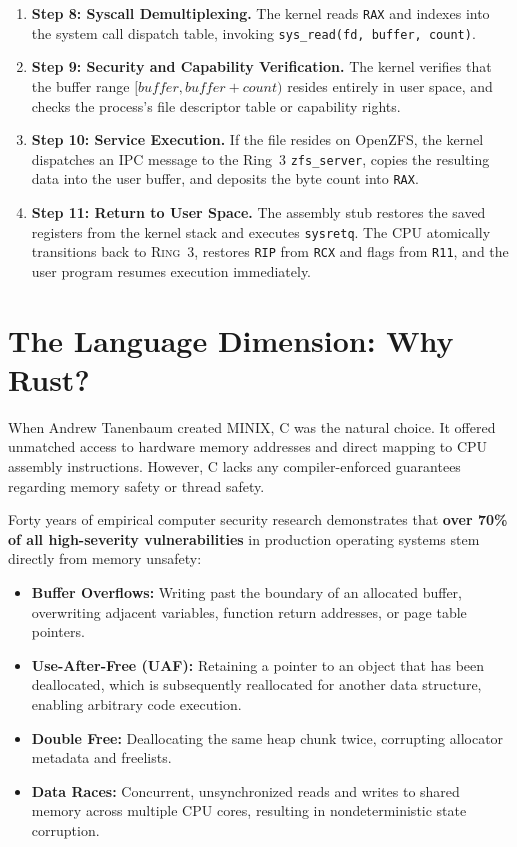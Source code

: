 \begin{enumerate}
    \item \textbf{Step 8: Syscall Demultiplexing.} The kernel reads \texttt{RAX} and indexes into the system call dispatch table, invoking \texttt{sys\_read(fd, buffer, count)}.
    \item \textbf{Step 9: Security and Capability Verification.} The kernel verifies that the buffer range $[buffer, buffer + count)$ resides entirely in user space, and checks the process's file descriptor table or capability rights.
    \item \textbf{Step 10: Service Execution.} If the file resides on OpenZFS, the kernel dispatches an IPC message to the Ring~3 \texttt{zfs\_server}, copies the resulting data into the user buffer, and deposits the byte count into \texttt{RAX}.
    \item \textbf{Step 11: Return to User Space.} The assembly stub restores the saved registers from the kernel stack and executes \texttt{sysretq}. The CPU atomically transitions back to \textsc{Ring~3}, restores \texttt{RIP} from \texttt{RCX} and flags from \texttt{R11}, and the user program resumes execution immediately.
\end{enumerate}

\section{The Language Dimension: Why Rust?}
\label{sec:why_rust_deep}

When Andrew Tanenbaum created MINIX, C was the natural choice. It offered unmatched access to hardware memory addresses and direct mapping to CPU assembly instructions. However, C lacks any compiler-enforced guarantees regarding memory safety or thread safety.

Forty years of empirical computer security research demonstrates that \textbf{over 70\% of all high-severity vulnerabilities} in production operating systems stem directly from memory unsafety:
\begin{itemize}
    \item \textbf{Buffer Overflows:} Writing past the boundary of an allocated buffer, overwriting adjacent variables, function return addresses, or page table pointers.
    \item \textbf{Use-After-Free (UAF):} Retaining a pointer to an object that has been deallocated, which is subsequently reallocated for another data structure, enabling arbitrary code execution.
    \item \textbf{Double Free:} Deallocating the same heap chunk twice, corrupting allocator metadata and freelists.
    \item \textbf{Data Races:} Concurrent, unsynchronized reads and writes to shared memory across multiple CPU cores, resulting in nondeterministic state corruption.
\end{itemize}

